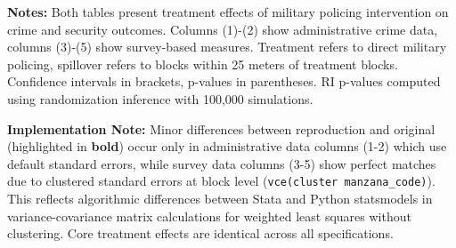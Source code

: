 \documentclass[11pt]{article}
\begin{document}
\vspace{1em}

\noindent \textbf{Notes:} Both tables present treatment effects of military policing intervention on crime and security outcomes. Columns (1)-(2) show administrative crime data, columns (3)-(5) show survey-based measures. Treatment refers to direct military policing, spillover refers to blocks within 25 meters of treatment blocks. Confidence intervals in brackets, p-values in parentheses. RI p-values computed using randomization inference with 100,000 simulations.

\vspace{0.3em}

\noindent \textbf{Implementation Note:} Minor differences between reproduction and original (highlighted in \textbf{bold}) occur only in administrative data columns (1-2) which use default standard errors, while survey data columns (3-5) show perfect matches due to clustered standard errors at block level (\texttt{vce(cluster manzana\_code)}). This reflects algorithmic differences between Stata and Python statsmodels in variance-covariance matrix calculations for weighted least squares without clustering. Core treatment effects are identical across all specifications.
\end{document}
